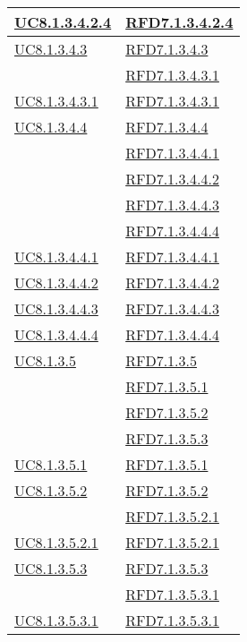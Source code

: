 \begin{longtable}{|>{\centering}m{5cm}|m{5cm}<{\centering}|}
\hyperref[UC8.1.3.4.2.4]{UC8.1.3.4.2.4} & \hyperlink{RFD7.1.3.4.2.4}{RFD7.1.3.4.2.4}\\ \hline
\hyperref[UC8.1.3.4.3]{UC8.1.3.4.3} & \hyperlink{RFD7.1.3.4.3}{RFD7.1.3.4.3}\\
& \hyperlink{RFD7.1.3.4.3.1}{RFD7.1.3.4.3.1}\\ \hline
\hyperref[UC8.1.3.4.3.1]{UC8.1.3.4.3.1} & \hyperlink{RFD7.1.3.4.3.1}{RFD7.1.3.4.3.1}\\ \hline
\hyperref[UC8.1.3.4.4]{UC8.1.3.4.4} & \hyperlink{RFD7.1.3.4.4}{RFD7.1.3.4.4}\\
& \hyperlink{RFD7.1.3.4.4.1}{RFD7.1.3.4.4.1}\\
& \hyperlink{RFD7.1.3.4.4.2}{RFD7.1.3.4.4.2}\\
& \hyperlink{RFD7.1.3.4.4.3}{RFD7.1.3.4.4.3}\\
& \hyperlink{RFD7.1.3.4.4.4}{RFD7.1.3.4.4.4}\\ \hline
\hyperref[UC8.1.3.4.4.1]{UC8.1.3.4.4.1} & \hyperlink{RFD7.1.3.4.4.1}{RFD7.1.3.4.4.1}\\ \hline
\hyperref[UC8.1.3.4.4.2]{UC8.1.3.4.4.2} & \hyperlink{RFD7.1.3.4.4.2}{RFD7.1.3.4.4.2}\\ \hline
\hyperref[UC8.1.3.4.4.3]{UC8.1.3.4.4.3} & \hyperlink{RFD7.1.3.4.4.3}{RFD7.1.3.4.4.3}\\ \hline
\hyperref[UC8.1.3.4.4.4]{UC8.1.3.4.4.4} & \hyperlink{RFD7.1.3.4.4.4}{RFD7.1.3.4.4.4}\\ \hline
\hyperref[UC8.1.3.5]{UC8.1.3.5} & \hyperlink{RFD7.1.3.5}{RFD7.1.3.5}\\
& \hyperlink{RFD7.1.3.5.1}{RFD7.1.3.5.1}\\
& \hyperlink{RFD7.1.3.5.2}{RFD7.1.3.5.2}\\
& \hyperlink{RFD7.1.3.5.3}{RFD7.1.3.5.3}\\ \hline
\hyperref[UC8.1.3.5.1]{UC8.1.3.5.1} & \hyperlink{RFD7.1.3.5.1}{RFD7.1.3.5.1}\\ \hline
\hyperref[UC8.1.3.5.2]{UC8.1.3.5.2} & \hyperlink{RFD7.1.3.5.2}{RFD7.1.3.5.2}\\
& \hyperlink{RFD7.1.3.5.2.1}{RFD7.1.3.5.2.1}\\ \hline
\hyperref[UC8.1.3.5.2.1]{UC8.1.3.5.2.1} & \hyperlink{RFD7.1.3.5.2.1}{RFD7.1.3.5.2.1}\\ \hline
\hyperref[UC8.1.3.5.3]{UC8.1.3.5.3} & \hyperlink{RFD7.1.3.5.3}{RFD7.1.3.5.3}\\
& \hyperlink{RFD7.1.3.5.3.1}{RFD7.1.3.5.3.1}\\ \hline
\hyperref[UC8.1.3.5.3.1]{UC8.1.3.5.3.1} & \hyperlink{RFD7.1.3.5.3.1}{RFD7.1.3.5.3.1}\\ \hline

\end{longtable}
